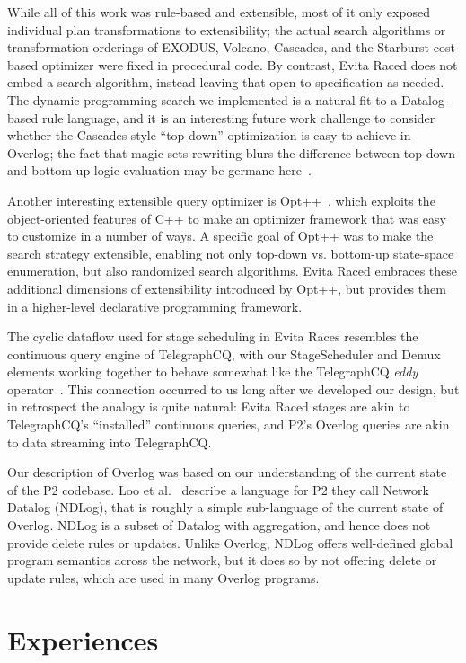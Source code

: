 \documentclass{sigmod08}
\begin{document}
While all of this work was rule-based and extensible, most of it only exposed individual plan transformations to extensibility; the actual search algorithms or transformation orderings of EXODUS, Volcano, Cascades, and the Starburst cost-based optimizer were fixed in procedural code.  By contrast, Evita Raced does not embed a search algorithm, instead leaving that open to specification as needed.  The dynamic programming search we implemented is a natural fit to a Datalog-based rule language, and it is an interesting future work challenge to consider whether the Cascades-style ``top-down'' optimization is easy to achieve in Overlog; the fact that magic-sets rewriting blurs the difference between top-down and bottom-up logic evaluation may be germane here~\cite{topdownbottomup}.

Another interesting extensible query optimizer is Opt++~\cite{kabradewitt}, which exploits the object-oriented features of C++ to make an optimizer framework that was easy to customize in a number of ways.  A specific goal of Opt++ was to make the search strategy extensible, enabling not only top-down vs. bottom-up state-space enumeration, but also randomized search algorithms.  Evita Raced embraces these additional dimensions of extensibility introduced by Opt++, but provides them in a higher-level declarative programming framework.

The cyclic dataflow used for stage scheduling in Evita Races resembles the continuous query engine of TelegraphCQ, with our StageScheduler and Demux elements working together to behave somewhat like the TelegraphCQ {\em eddy} operator~\cite{tcq-cidr}.  This connection occurred to us long after we developed our design, but in retrospect the analogy is quite natural: Evita Raced stages are akin to TelegraphCQ's ``installed'' continuous queries, and P2's Overlog queries are akin to data streaming into TelegraphCQ.

Our description of Overlog was based on our understanding of the current state of the P2 codebase.  Loo et al.~\cite{loo-sigmod06} describe a language for P2 they call Network Datalog (NDLog), that is roughly a simple sub-language of the current state of Overlog.  NDLog is a subset of Datalog with aggregation, and hence does not provide delete rules or updates.  Unlike Overlog, NDLog offers well-defined global program semantics across the network, but it does so by not offering delete or update rules, which are used in many Overlog programs.


\section{Experiences}
\label{sec:gripes}
\end{document}
